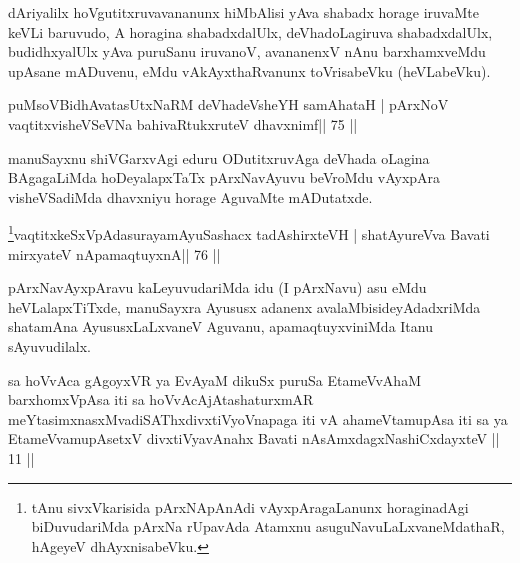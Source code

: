 \begin{artha}
dAriyalilx hoVgutitxruvavananunx hiMbAlisi yAva shabadx horage iruvaMte keVLi baruvudo, A horagina shabadxdalUlx, deVhadoLagiruva shabadxdalUlx, budidhxyalUlx yAva puruSanu iruvanoV, avananenxV nAnu barxhamxveMdu upAsane mADuvenu, eMdu vAkAyxthaRvanunx toVrisabeVku (heVLabeVku).
\end{artha} 


\begin{shl}
puMsoV\s BidhAvatasUtxNaRM deVhadeVsheYH samAhataH |
pArxNoV vaqtitxvisheVSeVNa bahivaRtukxruteV dhavxnimf\hfill || 75 ||
\end{shl}

\begin{artha}
manuSayxnu shiVGarxvAgi eduru ODutitxruvAga deVhada oLagina BAgagaLiMda hoDeyalapxTaTx pArxNavAyuvu beVroMdu vAyxpAra visheVSadiMda dhavxniyu horage AguvaMte mADutatxde.
\end{artha} 



\begin{shl}
\footnote{tAnu sivxVkarisida pArxNApAnAdi vAyxpAragaLanunx horaginadAgi biDuvudariMda pArxNa rUpavAda Atamxnu asuguNavuLaLxvaneMdathaR, hAgeyeV dhAyxnisabeVku.}vaqtitxkeSxVpAdasurayamAyuSashacx tadAshirxteVH |
shatAyureVva Bavati mirxyateV nApamaqtuyxnA\hfill || 76 ||
\end{shl}

\begin{artha}
pArxNavAyxpAravu kaLeyuvudariMda idu (I pArxNavu) asu eMdu heVLalapxTiTxde, manuSayxra Ayususx adanenx avalaMbisideyAdadxriMda shatamAna AyususxLaLxvaneV Aguvanu, apamaqtuyxviniMda Itanu sAyuvudilalx.
\end{artha}



\begin{kandikeshl}
sa hoVvAca gAgoyxVR ya EvAyaM dikuSx puruSa EtameVvAhaM barxhomxVpAsa iti sa hoVvAcAjAtashaturxmAR meYtasimxnasxMvadiSAThx\break divxtiVyoV\s napaga iti vA ahameVtamupAsa iti sa ya EtameVvamupAsetxV divxtiVyavAnahx Bavati nAsAmxdagxNashiCxdayxteV || 11 ||
\end{kandikeshl}

